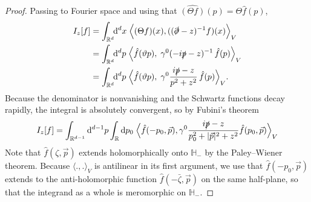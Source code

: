 \documentclass[10pt,a4paper,oneside,reqno]{amsart}
\newcommand{\reals}{\mathbb{R}}
\begin{document}
\begin{proof}
Passing to Fourier space and using that $\widehat{(\Theta f)}(p) = \Theta\hat{f}(p)$,
\begin{align}
    I_z[f] 
    &= \int_{\reals^{d}}\!\! \mathrm{d}^{d} x\; \Big\langle (\Theta f)(x), ((\slashed{\partial} - z)^{-1}f)(x)\Big\rangle_V\\
    &= \int_{\mathbb{R}^d}\!\! \mathrm{d}^d p\; \Big\langle \hat{f}(\vartheta p),\; \gamma^0 (-i\slashed{p} - z)^{-1}\, \hat{f}(p) \Big\rangle_V \\
    &= \int_{\mathbb{R}^d}\!\! \mathrm{d}^d p\; \Big\langle \hat{f}(\vartheta p),\; \gamma^0 \frac{i\slashed{p} - z}{p^2 + z^2}\, \hat{f}(p) \Big\rangle_V. \label{eq:Iz-fourier}
\end{align}
Because the denominator is nonvanishing and the Schwartz functions decay rapidly, the integral is absolutely convergent, so by Fubini's theorem
\begin{equation}
    I_z[f] = \int_{\reals^{d-1}}\mathrm{d}^{d-1} p \int_{\reals}\mathrm{d} p_0\;\Big\langle   \hat{f}(-p_0,\vec p),\gamma^0\frac{i\slashed p - z}{p_0^2 +|\vec p|^2 +z^2}\hat{f}(p_0, \vec p)\Big\rangle_V
\end{equation}
Note that $\hat{f}(\zeta, \vec{p})$ extends holomorphically onto $\mathbb{H}_-$ by the Paley--Wiener theorem. Because  $\langle.,.\rangle_V$ is antilinear in its first argument, we use that $\hat{f}(-p_0,\vec{p})$ extends to the anti-holomorphic function $\hat{f}(-\bar{\zeta}, \vec{p})$ on the same half-plane, so that the integrand as a whole is meromorphic on $\mathbb{H}_-$.


\end{proof}
\end{document}
